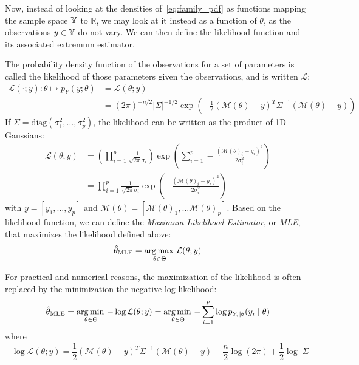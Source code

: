 \documentclass[../../Main_ManuscritThese.tex]{subfiles}
\begin{document}
Now, instead of looking at the densities of~\cref{eq:family_pdf} as functions mapping the sample space $\mathbb{Y}$ to $\mathbb{R}$, we may look at it instead as a function of $\theta$, as the observations $y\in\mathbb{Y}$ do not vary. We can then define the likelihood function and its associated extremum estimator.
\begin{definition}
  \label{def:mle}
  The probability density function of the observations for a set of parameters is called the likelihood of those parameters given the observations, and is written $\mathcal{L}$:
  \begin{align}
    \label{eq:likelihood_definition}
    \mathcal{L}(\cdot ;y): \theta \mapsto p_{Y}(y;\theta) &= \mathcal{L}(\theta;y) \\
    &=(2\pi)^{-n/2}\lvert \Sigma \rvert^{-1/2}\exp\left(-\frac{1}{2}(\mathcal{M}(\theta) - y)^T\Sigma^{-1}(\mathcal{M}(\theta) - y)\right)
  \end{align}
  If $\Sigma = \mathrm{diag}(\sigma^2_1,\dots, \sigma^2_p)$, the likelihood can be written as the product of 1D Gaussians: 
  \begin{align}
    \mathcal{L}(\theta;y) &= \left(\prod_{i=1}^p\frac{1}{\sqrt{2\pi}\sigma_i}\right)\exp\left(\sum_{i=1}^p -\frac{(\mathcal{M}(\theta)_i - y_i)^2}{2\sigma^2_i}\right) \\
                          &= \prod_{i=1}^p\frac{1}{\sqrt{2\pi}\sigma_i}\exp\left(-\frac{(\mathcal{M}(\theta)_i - y_i)^2}{2\sigma^2_i}\right)
  \end{align}
  with $y = [y_1, \dots, y_p]$ and $\mathcal{M}(\theta) = [\mathcal{M}(\theta)_1,\dots \mathcal{M}(\theta)_p]$.
  Based on the likelihood function, we can define the \emph{Maximum Likelihood Estimator}, or \emph{MLE}, that maximizes the likelihood defined above:
  \begin{equation}
    \label{eq:def_MLE}
    \hat{\theta}_{\mathrm{MLE}} = \operatorname*{arg\,max \,}_{\theta\in\Theta}\mathcal{L}(\theta;y)
  \end{equation}

\end{definition}
  For practical and numerical reasons, the maximization of the likelihood is often replaced by the minimization the negative log-likelihood:
  \begin{equation}
    \label{eq:MLE_iid}
    \hat{\theta}_{\mathrm{MLE}} = \operatorname*{arg\,min \,}_{\theta \in \Theta} -\log \mathcal{L}(\theta;y)= \operatorname*{arg\,min \,}_{\theta \in \Theta} -\sum_{i=1}^p\log p_{Y_i\mid \theta}(y_i \mid \theta) 
  \end{equation} 
  where
  \begin{equation}
    -\log\mathcal{L}(\theta;y) = \frac{1}{2}(\mathcal{M}(\theta) - y)^T\Sigma^{-1}(\mathcal{M}(\theta) - y)+  \frac{n}{2}\log(2\pi) + \frac{1}{2}\log\lvert \Sigma \rvert
  \end{equation}
\end{document}
